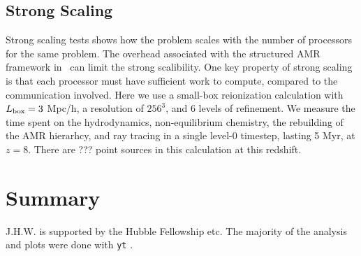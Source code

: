 \documentclass[12pt,preprint]{aastex}
\begin{document}
\subsection{Strong Scaling}
\label{sec:strong_sc}

Strong scaling tests shows how the problem scales with the number of
processors for the same problem.  The overhead associated with the
structured AMR framework in \enzo~can limit the strong scalibility.
One key property of strong scaling is that each processor must have
sufficient work to compute, compared to the communication involved.
Here we use a small-box reionization calculation with $L_{\rm box} =
3$ Mpc/h, a resolution of $256^3$, and 6 levels of refinement.  We
measure the time spent on the hydrodynamics, non-equilibrium
chemistry, the rebuilding of the AMR hierarhcy, and ray tracing in a
single level-0 timestep, lasting 5 Myr, at $z=8$.  There are ??? point
sources in this calculation at this redshift.

\section{Summary}

\acknowledgments

J.H.W. is supported by the Hubble Fellowship etc.  The majority of the
analysis and plots were done with \texttt{yt} \citep{yt}.

\clearpage
%

\end{document}
